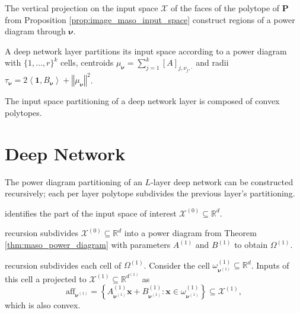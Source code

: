 \begin{lemma}\label{lem:maso_projection_polytope}
    The vertical projection on the input space $\mathcal{X}$ of the faces of the polytope of $\mathbf{P}$ from Proposition \ref{prop:image_maso_input_space} construct regions of a power diagram through $\boldsymbol{\nu}$.
\end{lemma}

\begin{theorem}\label{thm:maso_power_diagram}
    A deep network layer partitions its input space according to a power diagram with $\{1,\dots,r\}^k$ cells, centroids $\mu_{\boldsymbol{\nu}}=\sum_{j=1}^k[A]_{j,\nu_j,\cdot}$ and radii $\tau_{\boldsymbol{\nu}}=2\left\langle\mathbf{1},B_{\boldsymbol{\nu}}\right\rangle+\left\Vert\mu_{\boldsymbol{\nu}}\right\Vert^2$.
\end{theorem}

\begin{corollary}
    The input space partitioning of a deep network layer is composed of convex polytopes.
\end{corollary}

\section{Deep Network}

The power diagram partitioning of an $L$-layer deep network can be constructed recursively; each per layer polytope subdivides the previous layer's partitioning.

 identifies the part of the input space of interest $\mathcal{X}^{(0)}\subseteq\mathbb{R}^d$.

 recursion subdivides $\mathcal{X}^{(0)}\subseteq\mathbb{R}^d$ into a power diagram from Theorem \ref{thm:maso_power_diagram} with parameters $A^{(1)}$ and $B^{(1)}$ to obtain $\Omega^{(1)}$.

 recursion subdivides each cell of $\Omega^{(1)}$. Consider the cell $\omega_{\boldsymbol{\nu}^{(1)}}^{(1)}\subseteq\mathbb{R}^d$. Inputs of this cell a projected to $\mathcal{X}^{(1)}\subseteq\mathbb{R}^{d^{(1)}}$ as $$\mathrm{aff}_{\boldsymbol{\nu}^{(1)}}=\left\{A_{\boldsymbol{\nu}^{(1)}}^{(1)}\mathbf{x}+B_{\boldsymbol{\nu}^{(1)}}^{(1)}:\mathbf{x}\in\omega_{\boldsymbol{\nu}^{(1)}}^{(1)}\right\}\subseteq\mathcal{X}^{(1)},$$which is also convex.

